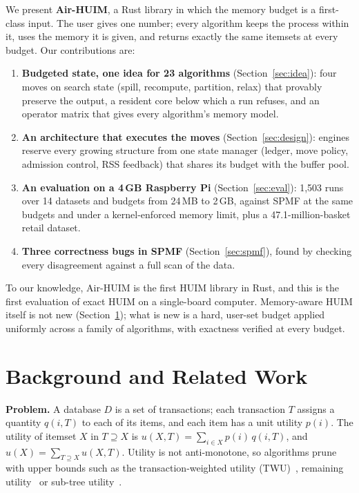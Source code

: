 \documentclass[conference]{IEEEtran}
\begin{document}
We present \textbf{Air-HUIM}, a Rust library in which the memory budget is a first-class input.
The user gives one number; every algorithm keeps the process within it, uses the memory it is
given, and returns exactly the same itemsets at every budget. Our contributions are:
\begin{enumerate}
\item \textbf{Budgeted state, one idea for 23 algorithms} (Section~\ref{sec:idea}): four moves on
search state (spill, recompute, partition, relax) that provably preserve the output, a resident
core below which a run refuses, and an operator matrix that gives every algorithm's memory model.
\item \textbf{An architecture that executes the moves} (Section~\ref{sec:design}): engines reserve
every growing structure from one state manager (ledger, move policy, admission control, RSS
feedback) that shares its budget with the buffer pool.
\item \textbf{An evaluation on a 4\,GB Raspberry Pi} (Section~\ref{sec:eval}): 1,503 runs over
14 datasets and budgets from 24\,MB to 2\,GB, against SPMF at the same budgets and under a
kernel-enforced memory limit, plus a 47.1-million-basket retail dataset.
\item \textbf{Three correctness bugs in SPMF} (Section~\ref{sec:spmf}), found by checking every
disagreement against a full scan of the data.
\end{enumerate}
To our knowledge, Air-HUIM is the first HUIM library in Rust, and this is the first evaluation of
exact HUIM on a single-board computer. Memory-aware HUIM itself is not new
(Section~\ref{sec:related}); what is new is a hard, user-set budget applied uniformly across a
family of algorithms, with exactness verified at every budget.

\section{Background and Related Work}\label{sec:related}

\textbf{Problem.} A database $D$ is a set of transactions; each transaction $T$ assigns a
quantity $q(i,T)$ to each of its items, and each item has a unit utility $p(i)$. The utility of
itemset $X$ in $T \supseteq X$ is $u(X,T)=\sum_{i\in X} p(i)\,q(i,T)$, and $u(X)=\sum_{T\supseteq X} u(X,T)$.
Utility is not anti-monotone, so algorithms prune with upper bounds such as the transaction-weighted
utility (TWU)~\cite{twophase2005}, remaining utility~\cite{huiminer2012} or sub-tree
utility~\cite{efim2017}.
\end{document}
